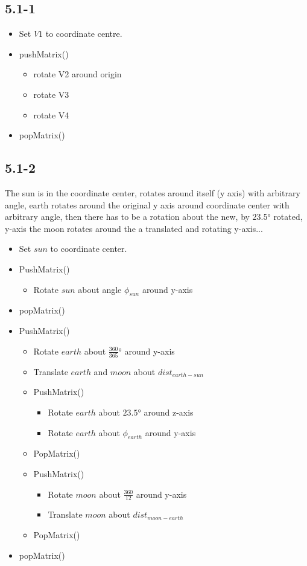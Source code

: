 \documentclass{article}
\begin{document}
\subsection*{5.1-1}
\begin{itemize}
	\item Set $V1$ to coordinate centre.
	\item pushMatrix()
	\begin{itemize}
		\item rotate V2 around origin
		\item rotate V3
		\item rotate V4
	\end{itemize}
	\item popMatrix()
\end{itemize}


\subsection*{5.1-2} The sun is in the coordinate center, rotates around itself (y axis) with arbitrary angle, earth rotates around the original y axis around coordinate center with arbitrary angle, then there has to be a rotation about the new, by 23.5° rotated, y-axis the moon rotates around the a translated and rotating y-axis...
\begin{itemize}
\item Set $sun$ to coordinate center.
\item PushMatrix()
\begin{itemize}
\item Rotate $sun$ about angle $\phi_{sun}$ around y-axis
\end{itemize}
\item popMatrix()
\end{itemize}


\begin{itemize}
\item PushMatrix()
\begin{itemize}
\item Rotate $earth$ about $\frac{360}{365}$° around y-axis
\item Translate $earth$ and $moon$ about $dist_{earth-sun}$
\item PushMatrix()
\begin{itemize}
\item Rotate $earth$ about $23.5°$ around z-axis
\item Rotate $earth$ about $\phi_{earth}$ around y-axis
\end{itemize}
\item PopMatrix()
\item PushMatrix()
\begin{itemize}
\item Rotate $moon$ about $\frac{360}{12}$ around y-axis
\item Translate $moon$ about $dist_{moon-earth}$
\end{itemize}
\item PopMatrix()
\end{itemize}

\item popMatrix()
\end{itemize}
\end{document}

